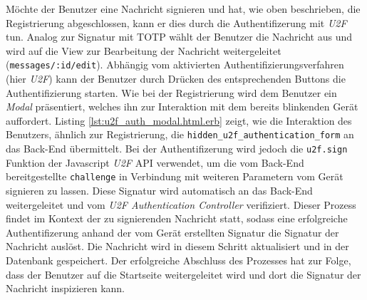 \documentclass[11pt,a4paper,ngerman]{scrreprt}
\begin{document}
Möchte der Benutzer eine Nachricht signieren und hat, wie oben beschrieben, die Registrierung abgeschlossen, kann er dies durch die Authentifizerung mit \textit{U2F} tun. Analog zur Signatur mit TOTP wählt der Benutzer die Nachricht aus und wird auf die View zur Bearbeitung der Nachricht weitergeleitet (\texttt{messages/:id/edit}). Abhängig vom aktivierten Authentifizierungsverfahren (hier \textit{U2F}) kann der Benutzer durch Drücken des entsprechenden Buttons die Authentifizierung starten. Wie bei der Registrierung wird dem Benutzer ein \textit{Modal} präsentiert, welches ihn zur Interaktion mit dem bereits blinkenden Gerät auffordert. Listing \ref{lst:u2f_auth_modal.html.erb} zeigt, wie die Interaktion des Benutzers, ähnlich zur Registrierung, die \texttt{hidden\_u2f\_authentication\_form} an das Back-End übermittelt. Bei der Authentifizerung wird jedoch die \texttt{u2f.sign} Funktion der Javascript \textit{U2F} API verwendet, um die vom Back-End bereitgestellte \texttt{challenge} in Verbindung mit weiteren Parametern vom Gerät signieren zu lassen. Diese Signatur wird automatisch an das Back-End weitergeleitet und vom \textit{U2F Authentication Controller} verifiziert. Dieser Prozess findet im Kontext der zu signierenden Nachricht statt, sodass eine erfolgreiche Authentifizerung anhand der vom Gerät erstellten Signatur die Signatur der Nachricht auslöst. Die Nachricht wird in diesem Schritt aktualisiert und in der Datenbank gespeichert. Der erfolgreiche Abschluss des Prozesses hat zur Folge, dass der Benutzer auf die Startseite weitergeleitet wird und dort die Signatur der Nachricht inspizieren kann.
\end{document}
